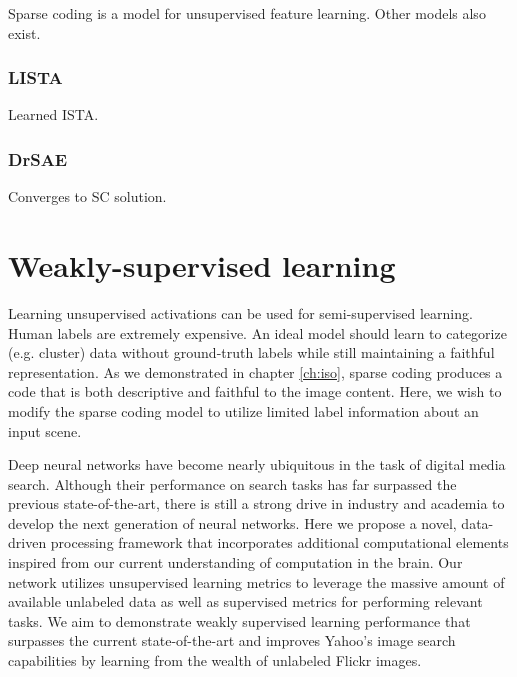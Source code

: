 Sparse coding is a model for unsupervised feature learning. Other models also exist.


\subsubsection{LISTA}
Learned ISTA.


\subsubsection{DrSAE}
Converges to SC solution.


\section{Weakly-supervised learning}

Learning unsupervised activations can be used for semi-supervised learning. Human labels are extremely expensive. An ideal model should learn to categorize (e.g. cluster) data without ground-truth labels while still maintaining a faithful representation. As we demonstrated in chapter \ref{ch:iso}, sparse coding produces a code that is both descriptive and faithful to the image content. Here, we wish to modify the sparse coding model to utilize limited label information about an input scene.

Deep neural networks have become nearly ubiquitous in the task of digital media search. Although their performance on search tasks has far surpassed the previous state-of-the-art, there is still a strong drive in industry and academia to develop the next generation of neural networks. Here we propose a novel, data-driven processing framework that incorporates additional computational elements inspired from our current understanding of computation in the brain. Our network utilizes unsupervised learning metrics to leverage the massive amount of available unlabeled data as well as supervised metrics for performing relevant tasks. We aim to demonstrate weakly supervised learning performance that surpasses the current state-of-the-art and improves Yahoo’s image search capabilities by learning from the wealth of unlabeled Flickr images.

